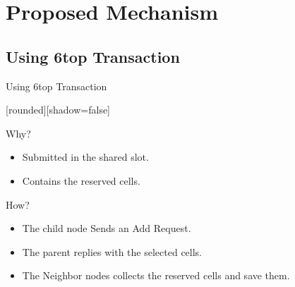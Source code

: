 \section{Proposed Mechanism}

\subsection{Using 6top Transaction}
\addtocounter{framenumber}{-1}
\begin{withoutheadline}
\begin{frame}{Using 6top Transaction}


[rounded][shadow=false]

\begin{block}{Why?}
    \begin{itemize}
    \item  Submitted in the shared slot.
    \item Contains the reserved cells.
    \end{itemize}
    \end{block}


\begin{block}{How?}
    \begin{itemize}
    \item The child node Sends an Add Request.
    \item<2-> The parent replies with the selected cells.
    \item<3-> The Neighbor nodes collects the reserved cells and save them. 
    \end{itemize}
    \end{block}
    
    
\begin{figure}[p]


\end{figure}
\end{frame}
\end{withoutheadline}
